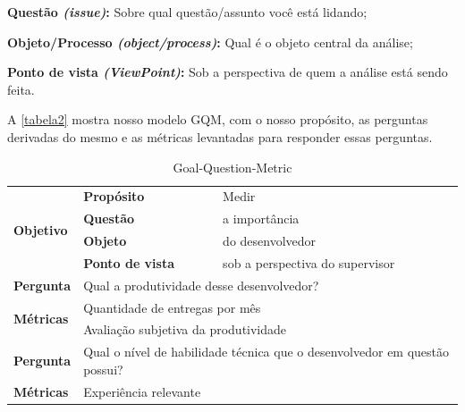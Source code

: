\begin{alineas}
	\item \textbf{Questão \textit{(issue)}:} Sobre qual questão/assunto você está lidando;
	\item \textbf{Objeto/Processo \textit{(object/process)}:} Qual é o objeto central da análise;
	\item \textbf{Ponto de vista \textit{(ViewPoint)}:} Sob a perspectiva de quem a análise está sendo feita.
\end{alineas}
	
A \autoref{tabela2} mostra nosso modelo GQM, com o nosso propósito, as perguntas derivadas do mesmo e as métricas levantadas para responder essas perguntas.


\begin{table}[h]
	\caption{Goal-Question-Metric}
	\label{tabela2}
	\def\arraystretch{1.5}
	\begin{tabular}{|p{2cm}|p{6.25cm}|p{6.25cm}|}
		\hline
		\multirow{4}{*}{\textbf{Objetivo}} & \textbf{Propósito}                              & Medir                                                 \\ \cline{2-3} 
		& \textbf{Questão}                                & a importância                                         \\ \cline{2-3} 
		& \textbf{Objeto}                                 & do desenvolvedor                                      \\ \cline{2-3} 
		& \textbf{Ponto de vista}                         & sob a perspectiva do supervisor                       \\ \hline
		\textbf{Pergunta}                  & \multicolumn{2}{l|}{Qual a produtividade desse desenvolvedor?}                                          \\ \hline\hline
		\multirow{2}{*}{\textbf{Métricas}} & \multicolumn{2}{l|}{Quantidade de entregas por mês}                                                     \\ \cline{2-3} 
		& \multicolumn{2}{l|}{Avaliação subjetiva da produtividade}                                               \\ \hline\hline
		\textbf{Pergunta}                  & \multicolumn{2}{l|}{\parbox[c][1.2cm][c]{12cm}{ Qual o nível de habilidade técnica que o desenvolvedor em questão possui?}}          \\ \hline
		\multirow{4}{*}{\textbf{Métricas}} & \multicolumn{2}{l|}{Experiência relevante}                                                              \\ \cline{2-3} 

\end{tabular}
\end{table}
